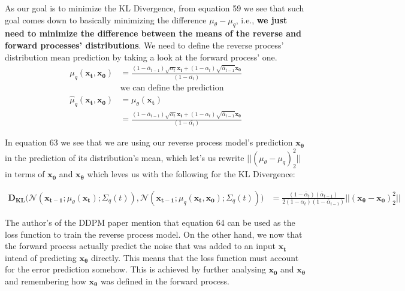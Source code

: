 \documentclass{article}
\begin{document}
As our goal is to minimize the KL Divergence, from equation 59 we see that such goal comes down to basically minimizing the 
difference $\mu_\theta - \mu_q$, i.e., \textbf{we just need to minimize the difference between the means of the reverse and forward processes' distributions}. We need to define the reverse process' distribution mean prediction by taking a look at the forward process' one. 
\begin{align}
	 \mu_q(\mathbf{x_t, x_0}) &= \frac{(1-\bar{\alpha}_{t-1})\sqrt{\alpha_t} \mathbf{x_t} + (1- \alpha_t) \sqrt{\bar{\alpha}_{t-1}  } \mathbf{x_0}}{(1-\bar{\alpha_t})} \\
	 & \text{we can define the prediction }\\
	 \hat\mu_q(\mathbf{x_t, x_0}) &=  \mu_\theta(\mathbf{x_t}) \\
	 &= \frac{(1-\bar{\alpha}_{t-1})\sqrt{\alpha_t} \mathbf{x_t} + (1- \alpha_t) \sqrt{\bar{\alpha}_{t-1}  } \mathbf{x_\theta}}{(1-\bar{\alpha_t})}
\end{align}
	
In equation 63 we see that we are using our reverse process model's prediction $\mathbf{x_\theta}$ in the prediction of its distribution's mean, which let's us rewrite $\big|\big| (\mu_\theta - \mu_q)^2_2\big|\big|$ in terms of $\mathbf{x_0}$ and $\mathbf{x_\theta}$ which leves us with the following for the KL Divergence:
	
\begin{align}
	 \mathbf{D_{KL}}\big(   \mathcal{N}(\mathbf{x_{t-1}};  \mu_\theta(\mathbf{x_t}); \Sigma_q(t)), \mathcal{N}(\mathbf{x_{t-1}};  \mu_q(\mathbf{x_t, x_0}); \Sigma_q(t)) \big) &= \frac{(1- \bar{\alpha}_t)(\bar\alpha_{t-1}) }{2(1-\alpha_t)(1- \bar\alpha_{t-1})} \big|\big| (\mathbf{x_\theta - x_0})^2_2 \big|\big|
\end{align}
	
The author's of the DDPM paper mention that equation 64 can be used as the loss function to train the reverse process model. On the other hand, we now that the forward process actually predict the noise that was added to an input $\mathbf{x_t}$ intead of predicting $\mathbf{x_\theta}$ directly. This means that the loss function must account for the error prediction somehow. This is achieved by further analysing $\mathbf{x_0}$ and $\mathbf{x_\theta}$ and remembering how $\mathbf{x_\theta}$ was defined in the forward process. 
	
\end{document}
